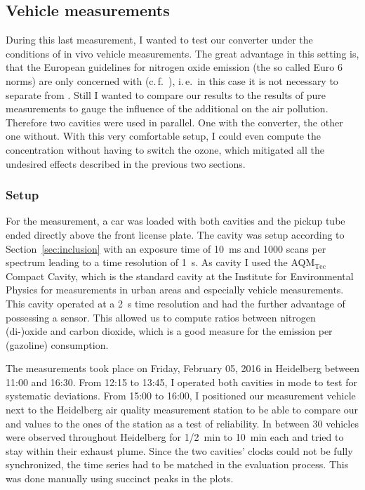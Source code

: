 \subsection{Vehicle measurements}
\label{sec:vehicle}

During this last measurement, I wanted to test our converter under
the conditions of in vivo vehicle measurements. The great advantage in
this setting is, that the European guidelines for nitrogen oxide
emission (the so called Euro 6 norms) are only concerned with 
(c.\,f.~\cite{eu}), i.\,e.\ in this case it is not necessary to separate
 from . Still I wanted to compare our 
results to the results of pure  measurements to gauge the
influence of the additional  on the air pollution. Therefore
two cavities were used in parallel. One with the converter, the
other one without. With this very comfortable setup, I could even
compute the  concentration without having to switch the ozone,
which mitigated all the undesired effects described in the previous
two sections.

\subsubsection{Setup}
\label{sec:vehicle-setup}

For the measurement, a car was loaded with both cavities and the
pickup tube ended directly above the front license plate. The
 cavity was setup according to Section~\ref{sec:inclusion}
with an exposure time of \SI{10}{\milli\second} and 1000 scans per
spectrum leading to a time resolution of \SI{1}{\second}. As 
cavity I used the AQM$_{\text{Tec}}$ Compact Cavity, which is the
standard cavity at the Institute for Environmental Physics for
 measurements in urban areas and especially vehicle
measurements. This cavity operated at a \SI{2}{\second} time
resolution and had the further advantage of possessing a 
sensor. This allowed us to compute ratios between nitrogen (di-)oxide
and carbon dioxide, which is a good measure for the emission per
(gazoline) consumption.

The measurements took place on Friday, February 05, 2016 in Heidelberg
between 11:00 and 16:30. From 12:15 to 13:45, I operated both
cavities in  mode to test for systematic deviations. From
15:00 to 16:00, I positioned our measurement vehicle next to the
Heidelberg air quality measurement station to be able to compare our
 and  values to the ones of the station as a test of
reliability. In between 30 vehicles were observed throughout
Heidelberg for {\nfrac{} 1/2}~\si{\minute} to \SI{10}{\minute} each
and tried to stay within their exhaust plume. Since the two cavities'
clocks could not be fully synchronized, the time series had to be
matched in the evaluation process. This was done manually using succinct
peaks in the plots.

